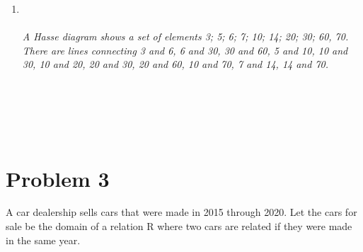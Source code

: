 \documentclass{amsart}
\theoremstyle{definition}
\theoremstyle{Exercise}
\theoremstyle{remark}
\theoremstyle{rule}
\numberwithin{equation}{section}
\begin{document}
\begin{enumerate}[label=(\alph{*})]
		\item {} \\\\
			{\color{blue}{\bf Figure 5:} \emph{A Hasse diagram shows a set of elements {3; 5; 6; 7; 10; 14; 20; 30; 60, 70}. There are lines connecting 3 and 6, 6 and 30, 30 and 60, 5 and 10, 10 and 30, 10 and 20, 20 and 30, 20 and 60, 10 and 70, 7 and 14, 14 and 70. } }
			\\\\
			\\\\
	\end{enumerate}
	\newpage
	~\\
	\section*{Problem 3}
	A car dealership sells cars that were made in 2015 through 2020. Let the cars for
	sale be the domain of a relation R where two cars are related if they were made
	in the same year.
\end{document}
